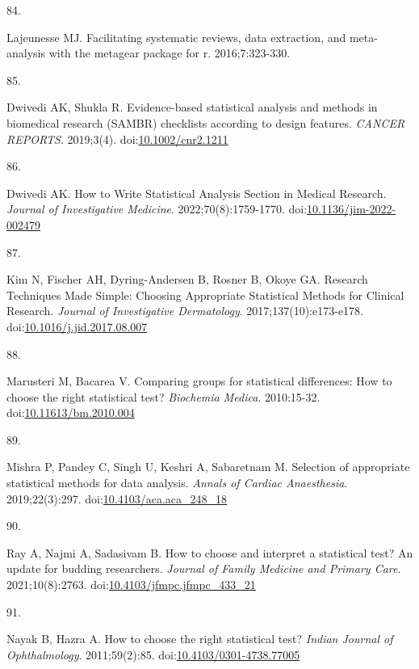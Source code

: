 \documentclass[
]{book}
\newlength{\cslhangindent}
\newlength{\csllabelwidth}
\newlength{\cslentryspacingunit} %
\newenvironment{CSLReferences}[2] %
 {%
  \setlength{\parindent}{0pt}
  \ifodd #1
  \let\oldpar\par
  \def\par{\hangindent=\cslhangindent\oldpar}
  \fi
  \setlength{\parskip}{#2\cslentryspacingunit}
 }%
 {}
\newcommand{\CSLLeftMargin}[1]{\parbox[t]{\csllabelwidth}{#1}}
\newcommand{\CSLRightInline}[1]{\parbox[t]{\linewidth - \csllabelwidth}{#1}\break}
\begin{document}
\begin{CSLReferences}{0}{0}
\leavevmode{}%
\CSLLeftMargin{84. }%
\CSLRightInline{Lajeunesse MJ. Facilitating systematic reviews, data extraction, and meta-analysis with the metagear package for r. 2016;7:323-330.}

\leavevmode{}%
\CSLLeftMargin{85. }%
\CSLRightInline{Dwivedi AK, Shukla R. Evidence{-}based statistical analysis and methods in biomedical research (SAMBR) checklists according to design features. \emph{CANCER REPORTS}. 2019;3(4). doi:\href{https://doi.org/10.1002/cnr2.1211}{10.1002/cnr2.1211}}

\leavevmode{}%
\CSLLeftMargin{86. }%
\CSLRightInline{Dwivedi AK. How to Write Statistical Analysis Section in Medical Research. \emph{Journal of Investigative Medicine}. 2022;70(8):1759-1770. doi:\href{https://doi.org/10.1136/jim-2022-002479}{10.1136/jim-2022-002479}}

\leavevmode{}%
\CSLLeftMargin{87. }%
\CSLRightInline{Kim N, Fischer AH, Dyring-Andersen B, Rosner B, Okoye GA. Research Techniques Made Simple: Choosing Appropriate Statistical Methods for Clinical Research. \emph{Journal of Investigative Dermatology}. 2017;137(10):e173-e178. doi:\href{https://doi.org/10.1016/j.jid.2017.08.007}{10.1016/j.jid.2017.08.007}}

\leavevmode{}%
\CSLLeftMargin{88. }%
\CSLRightInline{Marusteri M, Bacarea V. Comparing groups for statistical differences: How to choose the right statistical test? \emph{Biochemia Medica}. 2010:15-32. doi:\href{https://doi.org/10.11613/bm.2010.004}{10.11613/bm.2010.004}}

\leavevmode{}%
\CSLLeftMargin{89. }%
\CSLRightInline{Mishra P, Pandey C, Singh U, Keshri A, Sabaretnam M. Selection of appropriate statistical methods for data analysis. \emph{Annals of Cardiac Anaesthesia}. 2019;22(3):297. doi:\href{https://doi.org/10.4103/aca.aca_248_18}{10.4103/aca.aca\_248\_18}}

\leavevmode{}%
\CSLLeftMargin{90. }%
\CSLRightInline{Ray A, Najmi A, Sadasivam B. How to choose and interpret a statistical test? An update for budding researchers. \emph{Journal of Family Medicine and Primary Care}. 2021;10(8):2763. doi:\href{https://doi.org/10.4103/jfmpc.jfmpc_433_21}{10.4103/jfmpc.jfmpc\_433\_21}}

\leavevmode{}%
\CSLLeftMargin{91. }%
\CSLRightInline{Nayak B, Hazra A. How to choose the right statistical test? \emph{Indian Journal of Ophthalmology}. 2011;59(2):85. doi:\href{https://doi.org/10.4103/0301-4738.77005}{10.4103/0301-4738.77005}}


\end{CSLReferences}
\end{document}
